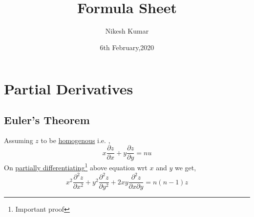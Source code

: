 \documentclass[12pt]{article}
\title{Formula Sheet}
\author{Nikesh Kumar}
\date{6th February,2020}
\begin{document}
\maketitle
\thispagestyle{empty}
\newpage
\tableofcontents
\thispagestyle{empty}
\newpage
{}
\section{Partial Derivatives}
\subsection{Euler's Theorem}
Assuming $z$ to be \underline{homogenous} i.e.  ,
\[ x\frac{\partial z}{\partial x} + y\frac{\partial z}{\partial y} = nu \]
On \underline{partially differentiating}\footnote{Important proof} above equation wrt $x$ and $y$ we get,
\[ x^2\frac{\partial^2 z}{\partial x^2} + y^2\frac{\partial^2 z}{\partial y^2} + 2xy\frac{\partial^2 z}{\partial x\partial y} = n(n-1)z \]
\end{document}

